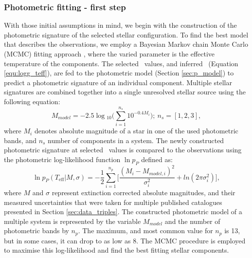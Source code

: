 \subsubsection{Photometric fitting - first step}
\label{sec:photo_fit}
With those initial assumptions in mind, we begin with the construction of the photometric signature of the selected stellar configuration. To find the best model that describes the observations, we employ a Bayesian Markov chain Monte Carlo (MCMC) fitting approach \cite{2013PASP..125..306F}, where the varied parameter is the effective temperature of the components. The selected \Teff\ values, and inferred \Logg\ (Equation \ref{equ:logg_teff}), are fed to the photometric model (Section \ref{sec:p_model}) to predict a photometric signature of an individual component. Multiple stellar signatures are combined together into a single unresolved stellar source using the following equation:
\begin{equation}
	M_{model} = -2.5 \log{}_{10} \Big( \sum_{i=1}^{n_s} 10^{-0.4 M_i} \Big); \ n_s=[1, 2, 3],
\end{equation}
where $M_i$ denotes absolute magnitude of a star in one of the used photometric bands, and $n_s$ number of components in a system. The newly constructed photometric signature at selected \Teff\ values is compared to the observations using the photometric log-likelihood function $\ln p_{P}$ defined as:
\begin{equation}
	\label{equ:lnp_p}
	\ln p_{P}(T_\mathrm{eff} | M, \sigma) = -\frac{1}{2} \sum_{i=1}^{n_p} \Big[ \frac{(M_i - M_{model, i})^2}{\sigma_i^2} +ln(2\pi\sigma_i^2) \Big],
\end{equation}
where $M$ and $\sigma$ represent extinction corrected absolute magnitudes, and their measured uncertainties that were taken for multiple published catalogues presented in Section \ref{sec:data_triples}. The constructed photometric model of a multiple system is represented by the variable $M_{model}$ and the number of photometric bands by $n_p$. The maximum, and most common value for $n_p$ is 13, but in some cases, it can drop to as low as 8. The MCMC procedure is employed to maximise this log-likelihood and find the best fitting stellar components.


